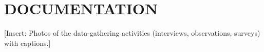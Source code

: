 \chapter{DOCUMENTATION}
[Insert: Photos of the data-gathering activities (interviews, observations, surveys) with captions.]
